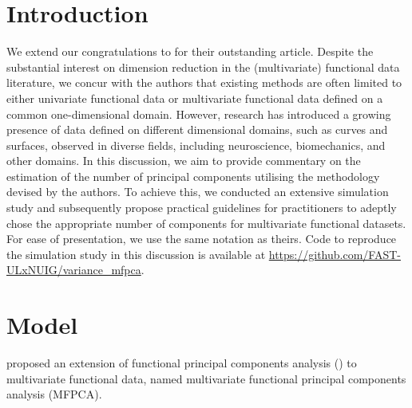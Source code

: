 
\section{Introduction} %
\label{sec:introduction}

We extend our congratulations to \cite{happMultivariateFunctionalPrincipal2018} for their outstanding article. Despite the substantial interest on dimension reduction in the (multivariate) functional data literature, we concur with the authors that existing methods are often limited to either univariate functional data or multivariate functional data defined on a common one-dimensional domain. However, research has introduced a growing presence of data defined on different dimensional domains, such as curves and surfaces, observed in diverse fields, including neuroscience, biomechanics, and other domains. In this discussion, we aim to provide commentary on the estimation of the number of principal components utilising the methodology devised by the authors. To achieve this, we conducted an extensive simulation study and subsequently propose practical guidelines for practitioners to adeptly chose the appropriate number of components for multivariate functional datasets. For ease of presentation, we use the same notation as theirs. Code to reproduce the simulation study in this discussion is available at \url{https://github.com/FAST-ULxNUIG/variance_mfpca}.


\section{Model} %
\label{sec:model}

\cite{happMultivariateFunctionalPrincipal2018} proposed an extension of functional principal components analysis (\cite{ramsayFunctionalDataAnalysis2005}) to multivariate functional data, named multivariate functional principal components analysis (MFPCA). 

